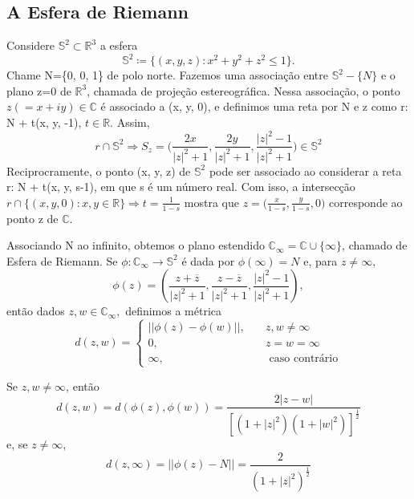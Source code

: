 \documentclass[complex.tex]{subfiles}
\begin{document}
\subsection{A Esfera de Riemann}
Considere $\mathbb{S}^{2}\subset{\mathbb{R}^{3}}$ a esfera
$$
	\mathbb{S}^{2}\coloneqq  \{(x, y, z): x ^{2} + y ^{2} + z ^{2}\leq{1}\}.
$$
Chame N=\{0, 0, 1\} de polo norte. Fazemos uma associação entre $\mathbb{S}^{2}-\{N\}$ e o plano z=0 de $\mathbb{R}^{3}$,
chamada de projeção estereográfica. Nessa associação, o ponto $z(=x + iy)\in\mathbb{C}$ é associado a (x, y, 0), e
definimos uma reta por N e z como r: N + t(x, y, -1), $t\in \mathbb{R}$. Assim,
$$
	r\cap{\mathbb{S}^{2}} \Rightarrow S _{z} = \biggl(\frac{2x}{|z|^{2}+1}, \frac{2y}{|z|^{2}+1}, \frac{|z|^{2}-1}{|z|^{2}+1}\biggr)\in \mathbb{S}^{2}
$$
Reciprocramente, o ponto (x, y, z) de $\mathbb{S}^{2}$ pode ser associado ao considerar a reta r: N + t(x, y, s-1), em que
s é um número real. Com isso, a intersecção $r\cap \{(x, y, 0): x, y \in \mathbb{R}\}\Rightarrow t=\frac{1}{1-s}$ mostra que
$z = \biggl(\frac{x}{1-s}, \frac{y}{1-s}, 0\biggr)$ corresponde ao ponto z de $\mathbb{C}$.

Associando N ao infinito, obtemos o plano estendido $\mathbb{C}_{\infty} = \mathbb{C}\cup \{\infty\}$, chamado de Esfera de Riemann. Se $\phi:\mathbb{C}_{\infty}\rightarrow \mathbb{S}^{2}$
é dada por $\phi(\infty) = N$ e, para $z\neq{\infty},$
$$
	\phi(z) = (\frac{z + \overline{z}}{|z|^{2} + 1}, \frac{z - \overline{z}}{|z|^{2}+1}, \frac{|z|^{2}-1}{|z|^{2}+1}),
$$
então dados $z, w\in \mathbb{C}_{\infty},$ definimos a métrica
$$
	d(z, w)=\left\{
	\begin{array}{ll}
		||\phi(z) - \phi(w)||, & \quad z, w\neq{\infty}       \\
		0,                     & \quad z = w = \infty         \\
		\infty,                & \quad \text{ caso contrário}
	\end{array}\right.
$$
\begin{example}
	Se $z, w\neq{\infty}$, então
	$$
		d(z, w) = d(\phi(z), \phi(w)) = \frac{2|z - w|}{[(1+|z|^{2})(1+|w|^{2})]^{\frac{1}{2}}}
	$$
	e, se $z\neq\infty$,
	$$
		d(z, \infty) = ||\phi(z) - N|| = \frac{2}{(1+|z|^{2})^{\frac{1}{2}}}
	$$
\end{example}
\end{document}
